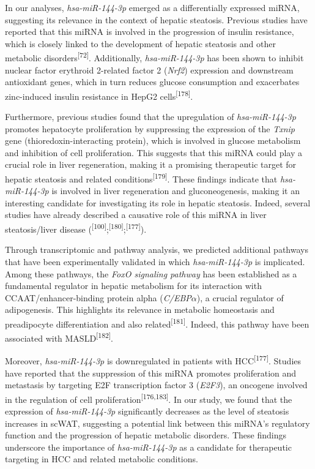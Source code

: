 \documentclass[
  11pt,
  letterpaper,
]{book}
\begin{document}
In our analyses, \emph{hsa-miR-144-3p} emerged as a differentially
expressed miRNA, suggesting its relevance in the context of hepatic
steatosis. Previous studies have reported that this miRNA is involved in
the progression of insulin resistance, which is closely linked to the
development of hepatic steatosis and other metabolic
disorders\textsuperscript{{[}72{]}}. Additionally, \emph{hsa-miR-144-3p}
has been shown to inhibit nuclear factor erythroid 2-related factor 2
(\emph{Nrf2}) expression and downstream antioxidant genes, which in turn
reduces glucose consumption and exacerbates zinc-induced insulin
resistance in HepG2 cells\textsuperscript{{[}178{]}}.

Furthermore, previous studies found that the upregulation of
\emph{hsa-miR-144-3p} promotes hepatocyte proliferation by suppressing
the expression of the \emph{Txnip} gene (thioredoxin-interacting
protein), which is involved in glucose metabolism and inhibition of cell
proliferation. This suggests that this miRNA could play a crucial role
in liver regeneration, making it a promising therapeutic target for
hepatic steatosis and related conditions\textsuperscript{{[}179{]}}.
These findings indicate that \emph{hsa-miR-144-3p} is involved in liver
regeneration and gluconeogenesis, making it an interesting candidate for
investigating its role in hepatic steatosis. Indeed, several studies
have already described a causative role of this miRNA in liver
steatosis/liver disease
(\textsuperscript{{[}100{]}};\textsuperscript{{[}180{]}};\textsuperscript{{[}177{]}}).

Through transcriptomic and pathway analysis, we predicted additional
pathways that have been experimentally validated in which
\emph{hsa-miR-144-3p} is implicated. Among these pathways, the
\emph{FoxO signaling pathway} has been established as a fundamental
regulator in hepatic metabolism for its interaction with
CCAAT/enhancer-binding protein alpha (\emph{C/EBP}\(\alpha\)), a crucial
regulator of adipogenesis. This highlights its relevance in metabolic
homeostasis and preadipocyte differentiation and also
related\textsuperscript{{[}181{]}}. Indeed, this pathway have been
associated with MASLD\textsuperscript{{[}182{]}}.

Moreover, \emph{hsa-miR-144-3p} is downregulated in patients with
HCC\textsuperscript{{[}177{]}}. Studies have reported that the
suppression of this miRNA promotes proliferation and metastasis by
targeting E2F transcription factor 3 (\emph{E2F3}), an oncogene involved
in the regulation of cell proliferation\textsuperscript{{[}176,183{]}}.
In our study, we found that the expression of \emph{hsa-miR-144-3p}
significantly decreases as the level of steatosis increases in scWAT,
suggesting a potential link between this miRNA's regulatory function and
the progression of hepatic metabolic disorders. These findings
underscore the importance of \emph{hsa-miR-144-3p} as a candidate for
therapeutic targeting in HCC and related metabolic conditions.
\end{document}
